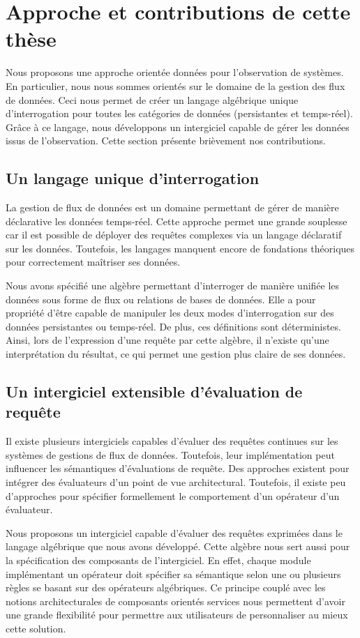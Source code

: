 \section{Approche et contributions de cette thèse}\label{sec:intro:demarche}
Nous proposons une approche orientée données pour l'observation de systèmes. En particulier, nous nous sommes orientés sur le domaine de la gestion des flux de données. Ceci nous permet de créer un langage algébrique unique d'interrogation pour toutes les catégories de données (persistantes et temps-réel). Grâce à ce langage, nous développons un intergiciel capable de gérer les données issus de l'observation. Cette section présente brièvement nos contributions.

\subsection{Un langage unique d'interrogation}
La gestion de flux de données est un domaine permettant de gérer de manière déclarative les données temps-réel. Cette approche permet une grande souplesse car il est possible de déployer des requêtes complexes via un langage déclaratif sur les données. Toutefois, les langages manquent encore de fondations théoriques pour correctement maîtriser ses données.

Nous avons spécifié une algèbre permettant d'interroger de manière unifiée les données sous forme de flux ou relations de bases de données. Elle a pour propriété d'être capable de manipuler les deux modes d'interrogation sur des données persistantes ou temps-réel. De plus, ces définitions sont déterministes. Ainsi, lors de l'expression d'une requête par cette algèbre, il n'existe qu'une interprétation du résultat, ce qui permet une gestion plus claire de ses données.

\subsection{Un intergiciel extensible d'évaluation de requête}
Il existe plusieurs intergiciels capables d'évaluer des requêtes continues sur les systèmes de gestions de flux de données. Toutefois, leur implémentation peut influencer les sémantiques d'évaluations de requête. Des approches existent pour intégrer des évaluateurs d'un point de vue architectural. Toutefois, il existe peu d'approches pour spécifier formellement le comportement d'un opérateur d'un évaluateur.

Nous proposons un intergiciel capable d'évaluer des requêtes exprimées dans le langage algébrique que nous avons développé. Cette algèbre nous sert aussi pour la spécification des composants de l'intergiciel. En effet, chaque module implémentant un opérateur doit spécifier sa sémantique selon une ou plusieurs règles se basant sur des opérateurs algébriques. Ce principe couplé avec les notions architecturales de composants orientés services nous permettent d'avoir une grande flexibilité pour permettre aux utilisateurs de personnaliser au mieux cette solution.

